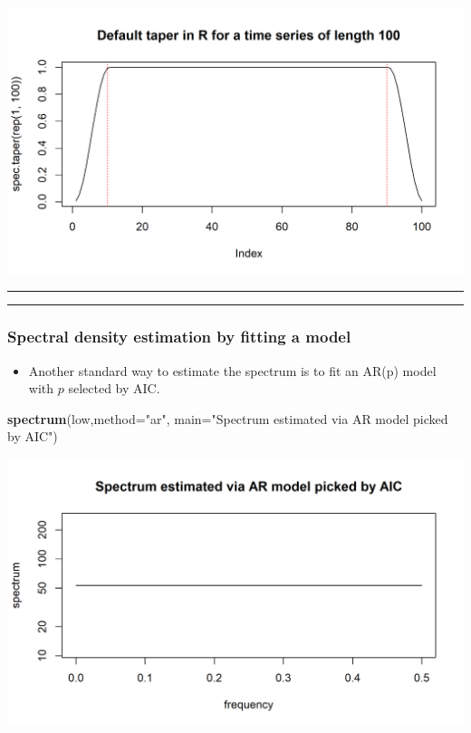 \documentclass[]{article}
\newenvironment{Shaded}{\begin{snugshade}}{\end{snugshade}}
\newcommand{\KeywordTok}[1]{\textcolor[rgb]{0.13,0.29,0.53}{\textbf{#1}}}
\newcommand{\DataTypeTok}[1]{\textcolor[rgb]{0.13,0.29,0.53}{#1}}
\newcommand{\StringTok}[1]{\textcolor[rgb]{0.31,0.60,0.02}{#1}}
\newcommand{\NormalTok}[1]{#1}
\providecommand{\tightlist}{%
  \setlength{\itemsep}{0pt}\setlength{\parskip}{0pt}}
\begin{document}
\begin{center}\includegraphics{figure/intro-taper_plot-1} \end{center}

\begin{center}\rule{0.5\linewidth}{\linethickness}\end{center}

\begin{center}\rule{0.5\linewidth}{\linethickness}\end{center}

\subsubsection{Spectral density estimation by fitting a
model}\label{spectral-density-estimation-by-fitting-a-model}

\begin{itemize}
\tightlist
\item
  Another standard way to estimate the spectrum is to fit an AR(p) model
  with \(p\) selected by AIC.
\end{itemize}

\begin{Shaded}
\begin{Highlighting}[]
\KeywordTok{spectrum}\NormalTok{(low,}\DataTypeTok{method=}\StringTok{"ar"}\NormalTok{, }\DataTypeTok{main=}\StringTok{"Spectrum estimated via AR model picked by AIC"}\NormalTok{)}
\end{Highlighting}
\end{Shaded}

\begin{center}\includegraphics{figure/intro-ar_periodogram-1} \end{center}
\end{document}
